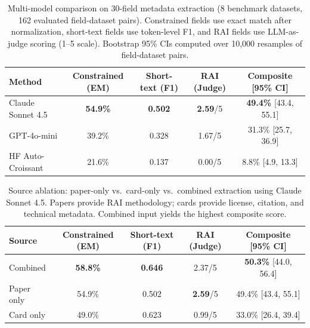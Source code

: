 

\begin{table}[t]
\centering
\caption{Multi-model comparison on 30-field metadata extraction (8 benchmark datasets, 162 evaluated field-dataset pairs). Constrained fields use exact match after normalization, short-text fields use token-level F1, and RAI fields use LLM-as-judge scoring (1--5 scale). Bootstrap 95\% CIs computed over 10,000 resamples of field-dataset pairs.}
\label{tab:multi-model}
\begin{tabular}{lcccc}
\toprule
Method & Constrained (EM) & Short-text (F1) & RAI (Judge) & Composite [95\% CI] \\
\midrule
Claude Sonnet 4.5 & \textbf{54.9\%} & \textbf{0.502} & \textbf{2.59}/5 & \textbf{49.4\%} [43.4, 55.1] \\
GPT-4o-mini & 39.2\% & 0.328 & 1.67/5 & 31.3\% [25.7, 36.9] \\
HF Auto-Croissant & 21.6\% & 0.137 & 0.00/5 & 8.8\% [4.9, 13.3] \\
\bottomrule
\end{tabular}
\end{table}



\begin{table}[t]
\centering
\caption{Source ablation: paper-only vs.\ card-only vs.\ combined extraction using Claude Sonnet 4.5. Papers provide RAI methodology; cards provide license, citation, and technical metadata. Combined input yields the highest composite score.}
\label{tab:source-ablation}
\begin{tabular}{lcccc}
\toprule
Source & Constrained (EM) & Short-text (F1) & RAI (Judge) & Composite [95\% CI] \\
\midrule
Combined & \textbf{58.8\%} & \textbf{0.646} & 2.37/5 & \textbf{50.3\%} [44.0, 56.4] \\
Paper only & 54.9\% & 0.502 & \textbf{2.59}/5 & 49.4\% [43.4, 55.1] \\
Card only & 49.0\% & 0.623 & 0.99/5 & 33.0\% [26.4, 39.4] \\
\bottomrule
\end{tabular}
\end{table}


